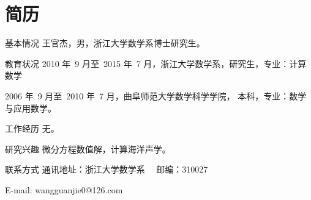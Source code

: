 \chapter{简\quad 历}

\begin{resumesection}{基本情况}
王官杰，男，浙江大学数学系博士研究生。
\end{resumesection}

\begin{resumelist}{教育状况}
2010 年~9 月至~2015 年~7
月，浙江大学数学系，研究生，专业：计算数学
 
2006 年~9 月至~2010 年~7 月，曲阜师范大学数学科学学院，
本科，专业：数学与应用数学。
\end{resumelist}

\begin{resumelist}{工作经历}
无。
\end{resumelist}

\begin{resumelist}{研究兴趣}
微分方程数值解，计算海洋声学。
\end{resumelist}

\begin{resumelist}{联系方式}
通讯地址：浙江大学数学系 \ \ 邮编：310027

E-mail: wangguanjie0@126.com
\end{resumelist}

